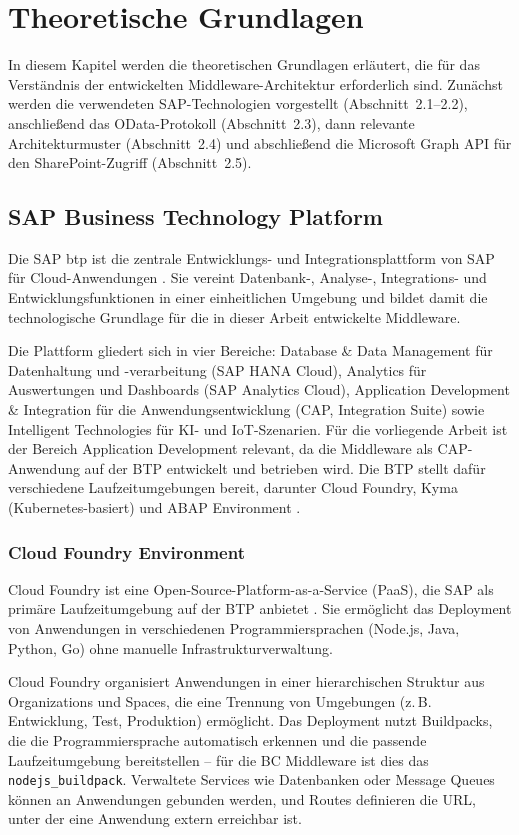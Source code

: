 \section{Theoretische Grundlagen}

In diesem Kapitel werden die theoretischen Grundlagen erläutert, die für das Verständnis der entwickelten Middleware-Architektur erforderlich sind. Zunächst werden die verwendeten SAP-Technologien vorgestellt (Abschnitt~2.1--2.2), anschließend das OData-Protokoll (Abschnitt~2.3), dann relevante Architekturmuster (Abschnitt~2.4) und abschließend die Microsoft Graph API für den SharePoint-Zugriff (Abschnitt~2.5).

\subsection{SAP Business Technology Platform}

Die SAP \gls{btp} ist die zentrale Entwicklungs- und Integrationsplattform von SAP für Cloud-Anwendungen \citep{sap2024btp}. Sie vereint Datenbank-, Analyse-, Integrations- und Entwicklungsfunktionen in einer einheitlichen Umgebung und bildet damit die technologische Grundlage für die in dieser Arbeit entwickelte Middleware.

Die Plattform gliedert sich in vier Bereiche: Database \& Data Management für Datenhaltung und -verarbeitung (SAP HANA Cloud), Analytics für Auswertungen und Dashboards (SAP Analytics Cloud), Application Development \& Integration für die Anwendungsentwicklung (CAP, Integration Suite) sowie Intelligent Technologies für KI- und IoT-Szenarien. Für die vorliegende Arbeit ist der Bereich Application Development relevant, da die Middleware als CAP-Anwendung auf der BTP entwickelt und betrieben wird. Die BTP stellt dafür verschiedene Laufzeitumgebungen bereit, darunter Cloud Foundry, Kyma (Kubernetes-basiert) und ABAP Environment \citep{erl2013}.

\subsubsection{Cloud Foundry Environment}

Cloud Foundry ist eine Open-Source-Platform-as-a-Service (PaaS), die SAP als primäre Laufzeitumgebung auf der BTP anbietet \citep{cloudfoundry2024}. Sie ermöglicht das Deployment von Anwendungen in verschiedenen Programmiersprachen (Node.js, Java, Python, Go) ohne manuelle Infrastrukturverwaltung.

Cloud Foundry organisiert Anwendungen in einer hierarchischen Struktur aus Organizations und Spaces, die eine Trennung von Umgebungen (z.\,B. Entwicklung, Test, Produktion) ermöglicht. Das Deployment nutzt Buildpacks, die die Programmiersprache automatisch erkennen und die passende Laufzeitumgebung bereitstellen -- für die BC Middleware ist dies das \texttt{nodejs\_buildpack}. Verwaltete Services wie Datenbanken oder Message Queues können an Anwendungen gebunden werden, und Routes definieren die URL, unter der eine Anwendung extern erreichbar ist.


